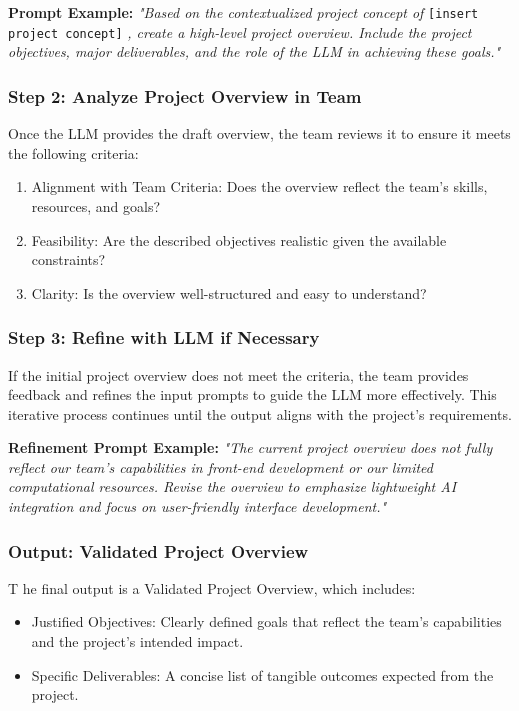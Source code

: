 \documentclass[14pt, a4paper]{article}
\begin{document}
\textbf{Prompt Example:} \textit{"Based on the contextualized project concept
of} \texttt{[insert project concept]} \textit{, create a high-level project
overview. Include the project objectives, major deliverables, and the role of
the LLM in achieving these goals."}

\subsubsection*{Step 2: Analyze Project Overview in Team}

Once the LLM provides the draft overview, the team reviews it to ensure it meets
the following criteria:

\begin{enumerate}
    \item Alignment with Team Criteria: Does the overview reflect the team's
    skills, resources, and goals?
    \item Feasibility: Are the described objectives realistic given the
    available constraints?
    \item Clarity: Is the overview well-structured and easy to understand?
\end{enumerate}

\subsubsection*{Step 3: Refine with LLM if Necessary}

If the initial project overview does not meet the criteria, the team provides
feedback and refines the input prompts to guide the LLM more effectively. This
iterative process continues until the output aligns with the project’s
requirements.

\textbf{Refinement Prompt Example:} \textit{"The current project overview does
not fully reflect our team’s capabilities in front-end development or our
limited computational resources. Revise the overview to emphasize lightweight AI
integration and focus on user-friendly interface development."}

\subsubsection{Output: Validated Project Overview}

T he final output is a Validated Project Overview, which includes:

\begin{itemize}
    \item Justified Objectives: Clearly defined goals that reflect the team’s
    capabilities and the project’s intended impact.
    \item Specific Deliverables: A concise list of tangible outcomes expected
    from the project.
\end{itemize}
\end{document}
